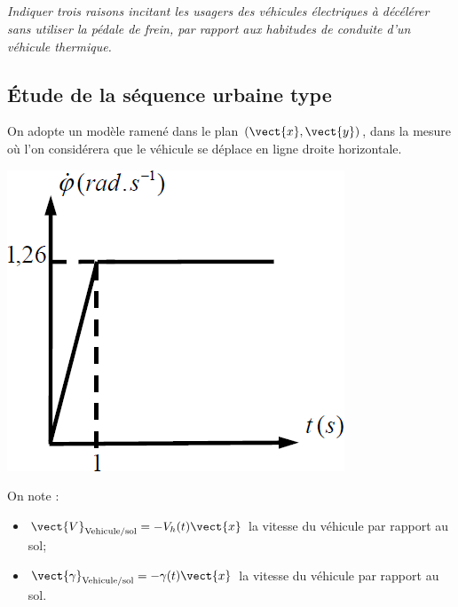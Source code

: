 \documentclass[10pt,fleqn]{article} %
\begin{document}
\begin{multicols}{2}
\subparagraph{}\textit{Indiquer trois raisons incitant les usagers des véhicules électriques à décélérer sans utiliser la pédale de frein, par rapport aux habitudes de conduite d’un véhicule thermique.}
\ifprof
\begin{corrige}
\end{corrige}
\else
\fi

\subsection*{Étude de la séquence urbaine type}

On adopte un modèle ramené dans le plan $\left(\vect{x},\vect{y}\right)$, dans la mesure où l’on considérera que le véhicule se déplace en ligne droite horizontale.

\begin{center}
\includegraphics[width=\linewidth]{images/fig_02}

\end{center}

On note :
\begin{itemize}
\item $\vect{V}_{\text{Vehicule/sol}} = -V_h(t)\vect{x}$ la vitesse du véhicule par rapport au sol;
\item $\vect{\gamma}_{\text{Vehicule/sol}} = -\gamma(t)\vect{x}$ la vitesse du véhicule par rapport au sol.
\end{itemize}


\end{multicols}
\end{document}

